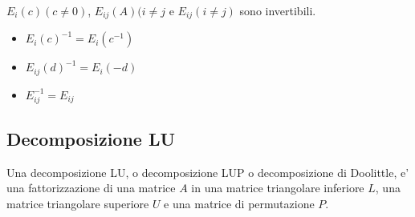 \documentclass[a4paper, 10pt]{article}
\begin{document}
	$E_{i}(c) (c \neq 0)$, $E_{ij}(A) (i \neq j$ e $E_{ij} (i \neq j)$ sono invertibili.
	\begin{itemize}
		\item $E_{i}(c)^{-1} = E_{i}(c^{-1})$
		\item $E_{ij}(d)^{-1} = E_{i}(-d)$
		\item $E_{ij}^{-1} = E_{ij}$
	\end{itemize}	 
	
	\subsection{Decomposizione LU}
	Una decomposizione LU, o decomposizione LUP o decomposizione di Doolittle, 
	e' una fattorizzazione di una matrice $A$ in una matrice triangolare inferiore $L$, una matrice triangolare
	superiore $U$ e una matrice di permutazione $P$. 
\end{document}
